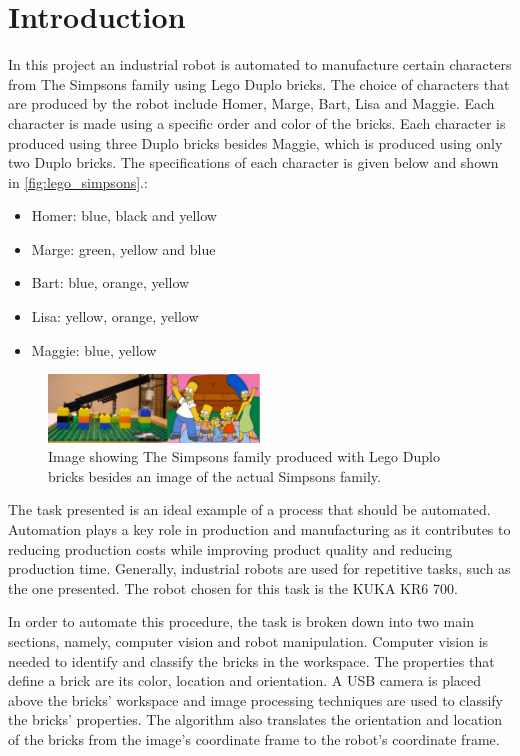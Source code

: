 \chapter{Introduction}\label{chap:introduction}
In this project an industrial robot is automated to manufacture certain characters from The Simpsons family using Lego Duplo bricks. The choice of characters that are produced by the robot include Homer, Marge, Bart, Lisa and Maggie. Each character is made using a specific order and color of the bricks. Each character is produced using three Duplo bricks besides Maggie, which is produced using only two Duplo bricks. The specifications of each character is given below and shown in \autoref{fig:lego_simpsons}.:

\begin{itemize}
	\item Homer: blue, black and yellow
	\item Marge: green, yellow and blue
	\item Bart: blue, orange, yellow
	\item Lisa: yellow, orange, yellow
	\item Maggie: blue, yellow
\end{itemize}

\begin{figure}[H]
    \includegraphics[width=0.5\textwidth]{figures/lego_simpsons.pdf}
    \caption{Image showing The Simpsons family produced with Lego Duplo bricks besides an image of the actual Simpsons family.}
    \label{fig:lego_simpsons}
\end{figure}

The task presented is an ideal example of a process that should be automated. Automation plays a key role in production and manufacturing as it contributes to reducing production costs while improving product quality and reducing production time. Generally, industrial robots are used for repetitive tasks, such as the one presented. The robot chosen for this task is the KUKA KR6 700.

In order to automate this procedure, the task is broken down into two main sections, namely, computer vision and robot manipulation. Computer vision is needed to identify and classify the bricks in the workspace. The properties that define a brick are its color, location and orientation. A USB camera is placed above the bricks' workspace and image processing techniques are used to classify the bricks' properties. The algorithm also translates the orientation and location of the bricks from the image's coordinate frame to the robot's coordinate frame.


